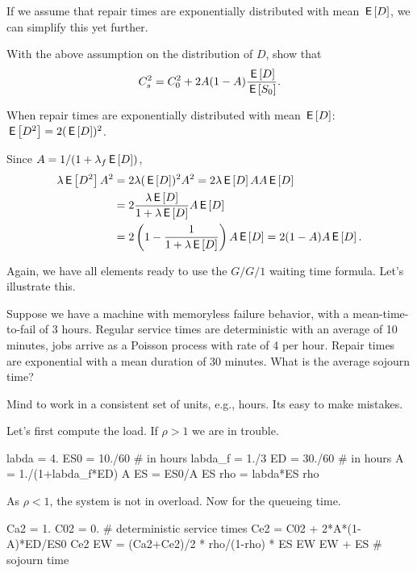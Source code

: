 If we assume that repair times are exponentially distributed with mean $\,\mathsf{E}\left[D\right]$, we can simplify this yet further.

\begin{exercise}[\faCalculator]
With the above assumption on the distribution of $D$, show that
  \begin{equation*}
    C_s^2 = C_0^2 + 2 A(1-A) \frac{\,\mathsf{E}\left[D\right]}{\,\mathsf{E}\left[S_0\right]}.
  \end{equation*}
\begin{solution} 
When repair times are exponentially distributed with mean $\,\mathsf{E}\left[D\right]$:  $\,\mathsf{E}\left[D^2\right]=2(\,\mathsf{E}\left[D\right])^2$. 

Since $A=1/(1+\lambda_f \,\mathsf{E}\left[D\right])$, 
  \begin{equation*}
    \begin{split}
    \lambda \,\mathsf{E}\left[D^2\right] A^2 
&= 2\lambda (\,\mathsf{E}\left[D\right])^2 A^2 = 2 \lambda \,\mathsf{E}\left[D\right] A A \,\mathsf{E}\left[D\right] \\
&= 2 \frac{\lambda \,\mathsf{E}\left[D\right] }{1+\lambda \,\mathsf{E}\left[D\right]} A \,\mathsf{E}\left[D\right] \\
&= 2 \left(1-\frac{1}{1+\lambda \,\mathsf{E}\left[D\right]}\right) A \,\mathsf{E}\left[D\right]  = 2(1-A)A \,\mathsf{E}\left[D\right].
    \end{split}
  \end{equation*}
\end{solution}
\end{exercise}

Again, we have all elements ready to use the $G/G/1$ waiting time formula. Let's illustrate this. 

\begin{exercise}[\faPhoto]
  Suppose we have a machine with memoryless failure behavior, with a mean-time-to-fail of $3$ hours. Regular service times are deterministic with an average of 10 minutes, jobs arrive as a Poisson process with rate of 4 per hour.  Repair times are exponential with a mean duration of 30 minutes. What is the average sojourn time?
  \begin{hint}
    Mind to work in a consistent set of units, e.g., hours. Its easy to make mistakes. 
  \end{hint}
  \begin{solution}
Let's first compute the load. If $\rho>1$ we are in trouble.
    \begin{pyconsole}
labda = 4.
ES0 = 10./60 # in hours
labda_f = 1./3
ED = 30./60 # in hours
A = 1./(1+labda_f*ED)
A
ES = ES0/A
ES
rho = labda*ES
rho
    \end{pyconsole}
As $\rho<1$, the system is not in overload. Now for the queueing time.
\begin{pyconsole}
Ca2 = 1.
C02 = 0. # deterministic service times
Ce2 = C02 + 2*A*(1-A)*ED/ES0
Ce2
EW = (Ca2+Ce2)/2 * rho/(1-rho) * ES
EW
EW + ES # sojourn time
\end{pyconsole}
  \end{solution}
\end{exercise}

